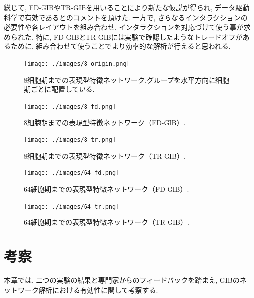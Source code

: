 \documentclass{kuee}
\begin{document}
総じて, FD-GIBやTR-GIBを用いることにより新たな仮説が得られ, データ駆動科学で有効であるとのコメントを頂けた.
一方で, さらなるインタラクションの必要性や各レイアウトを組み合わせ, インタラクションを対応づけて使う事が求められた.
特に, FD-GIBとTR-GIBには実験で確認したようなトレードオフがあるために, 組み合わせて使うことでより効率的な解析が行えると思われる.

\begin{figure}[t]
  \begin{center}
  \texttt{[image: ./images/8-origin.png]}
  \caption{8細胞期までの表現型特徴ネットワーク.グループを水平方向に細胞期ごとに配置している. \label{fig:8-origin}}
  \end{center}
\end{figure}

\begin{figure}[t]
  \begin{center}
  \texttt{[image: ./images/8-fd.png]}
  \caption{8細胞期までの表現型特徴ネットワーク（FD-GIB）. \label{fig:8-fd}}
  \end{center}
\end{figure}

\begin{figure}[t]
  \begin{center}
  \texttt{[image: ./images/8-tr.png]}
  \caption{8細胞期までの表現型特徴ネットワーク（TR-GIB）. \label{fig:8-tr}}
  \end{center}
\end{figure}

\begin{figure}[t]
  \begin{center}
  \texttt{[image: ./images/64-fd.png]}
  \caption{64細胞期までの表現型特徴ネットワーク（FD-GIB）. \label{fig:64-fd}}
  \end{center}
\end{figure}

\begin{figure}[t]
  \begin{center}
  \texttt{[image: ./images/64-tr.png]}
  \caption{64細胞期までの表現型特徴ネットワーク（TR-GIB）. \label{fig:64-tr}}
  \end{center}
\end{figure}

\chapter{考察}
本章では, 二つの実験の結果と専門家からのフィードバックを踏まえ, GIBのネットワーク解析における有効性に関して考察する.
\end{document}

